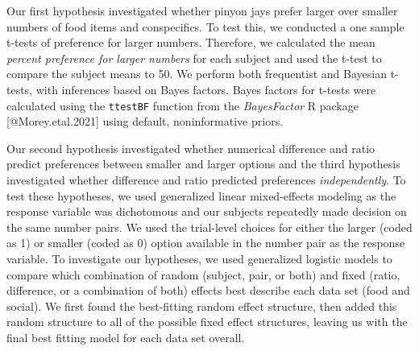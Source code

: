 \documentclass[
]{article}
\begin{document}
Our first hypothesis investigated whether pinyon jays prefer larger over
smaller numbers of food items and conspecifics. To test this, we
conducted a one sample t-tests of preference for larger numbers.
Therefore, we calculated the mean \emph{percent preference for larger
numbers} for each subject and used the t-test to compare the subject
means to 50. We perform both frequentist and Bayesian t-tests, with
inferences based on Bayes factors. Bayes factors for t-tests were
calculated using the \texttt{ttestBF} function from the
\emph{BayesFactor} R package {[}@Morey.etal.2021{]} using default,
noninformative priors.

Our second hypothesis investigated whether numerical difference and
ratio predict preferences between smaller and larger options and the
third hypothesis investigated whether difference and ratio predicted
preferences \emph{independently}. To test these hypotheses, we used
generalized linear mixed-effects modeling as the response variable was
dichotomous and our subjects repeatedly made decision on the same number
pairs. We used the trial-level choices for either the larger (coded as
1) or smaller (coded as 0) option available in the number pair as the
response variable. To investigate our hypotheses, we used generalized
logistic models to compare which combination of random (subject, pair,
or both) and fixed (ratio, difference, or a combination of both) effects
best describe each data set (food and social). We first found the
best-fitting random effect structure, then added this random structure
to all of the possible fixed effect structures, leaving us with the
final best fitting model for each data set overall.
\end{document}
